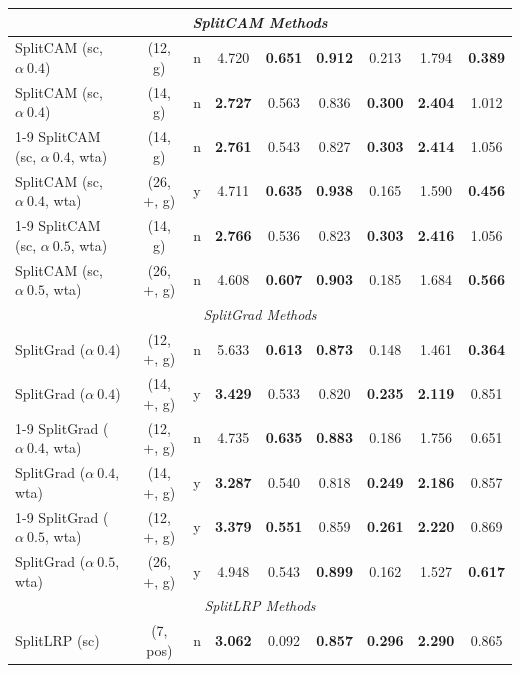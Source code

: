 \begin{longtable}{p{4cm}|cc|cccccc}
    \multicolumn{9}{c}{\textit{SplitCAM Methods}} \\
    \midrule
    SplitCAM (sc, $\alpha \ 0.4$) & (12, g) & n & 4.720 & \fboxsep=0.5pt\colorbox{red!20}{\textbf{0.651}} & \textbf{0.912} & 0.213 & 1.794 & \textbf{0.389} \\
    SplitCAM (sc, $\alpha \ 0.4$) & (14, g) & n & \fboxsep=0.5pt\colorbox{red!20}{\textbf{2.727}} & 0.563 & 0.836 & \textbf{0.300} & \textbf{2.404} & 1.012 \\
    \cmidrule(lr){1-9}
    SplitCAM (sc, $\alpha \ 0.4$, wta) & (14, g) & n & \textbf{2.761} & 0.543 & 0.827 & \textbf{0.303} & \textbf{2.414} & 1.056 \\
    SplitCAM (sc, $\alpha \ 0.4$, wta) & (26, +, g) & y & 4.711 & \textbf{0.635} & \fboxsep=0.5pt\colorbox{red!20}{\textbf{0.938}} & 0.165 & 1.590 & \textbf{0.456} \\
    \cmidrule(lr){1-9}
    SplitCAM (sc, $\alpha \ 0.5$, wta) & (14, g) & n & \textbf{2.766} & 0.536 & 0.823 & \textbf{0.303} & \textbf{2.416} & 1.056 \\
    SplitCAM (sc, $\alpha \ 0.5$, wta) & (26, +, g) & n & 4.608 & \textbf{0.607} & \textbf{0.903} & 0.185 & 1.684 & \textbf{0.566} \\
    \midrule
    \multicolumn{9}{c}{\textit{SplitGrad Methods}} \\
    \midrule
    SplitGrad ($\alpha \ 0.4$) & (12, +, g) & n & 5.633 & \textbf{0.613} & \textbf{0.873} & 0.148 & 1.461 & \textbf{0.364} \\
    SplitGrad ($\alpha \ 0.4$) & (14, +, g) & y & \textbf{3.429} & 0.533 & 0.820 & \textbf{0.235} & \textbf{2.119} & 0.851 \\
    \cmidrule(lr){1-9}
    SplitGrad ($\alpha \ 0.4$, wta) & (12, +, g) & n & 4.735 & \textbf{0.635} & \textbf{0.883} & 0.186 & 1.756 & 0.651 \\
    SplitGrad ($\alpha \ 0.4$, wta) & (14, +, g) & y & \textbf{3.287} & 0.540 & 0.818 & \textbf{0.249} & \textbf{2.186} & 0.857 \\
    \cmidrule(lr){1-9}
    SplitGrad ($\alpha \ 0.5$, wta) & (12, +, g) & y & \textbf{3.379} & \textbf{0.551} & 0.859 & \textbf{0.261} & \textbf{2.220} & 0.869 \\
    SplitGrad ($\alpha \ 0.5$, wta) & (26, +, g) & y & 4.948 & 0.543 & \textbf{0.899} & 0.162 & 1.527 & \textbf{0.617} \\
    \midrule
    \multicolumn{9}{c}{\textit{SplitLRP Methods}} \\
    \midrule
    SplitLRP (sc) & (7, pos) & n & \textbf{3.062} & 0.092 & \textbf{0.857} & \textbf{0.296} & \textbf{2.290} & 0.865 \\

\end{longtable}
